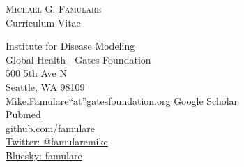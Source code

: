 \documentclass{article}
\begin{document}
\begin{center}
    \textsc{ \LARGE{Michael G. Famulare} } \\
    \Large{Curriculum Vitae} \\
\end{center}

\addresses
     {Institute for Disease Modeling\\
     Global Health | Gates Foundation\\
     500 5th Ave N\\
     Seattle, WA  98109\\
	 Mike.Famulare``at''gatesfoundation.org}
     {
     	\href{https://scholar.google.com/citations?user=TPWwr18AAAAJ\&hl=en}{Google Scholar} \\
      	\href{https://www.ncbi.nlm.nih.gov/pubmed/?term=Famulare\%20M\%5BAuthor\%5D\&cauthor=true\&cauthor_uid=19922290}{Pubmed} \\ 
     	\href{https://github.com/famulare/}{github.com/famulare} \\
     	\href{https://twitter.com/famulare_mike}{Twitter:  @famulare\textunderscore mike} \\
 	 	\href{https://bsky.app/profile/famulare.bsky.social}{Bluesky: famulare}	
  	}
 
\end{document}
